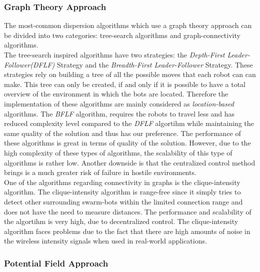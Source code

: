 \subsubsection{Graph Theory Approach}
The most-common dispersion algorithms which use a graph theory approach can be divided into two categories: tree-search algorithms and graph-connectivity algorithms.\\
The tree-search inspired algorithms have two strategies: the \emph{Depth-First Leader-Follower(DFLF)} Strategy and the \emph{Breadth-First Leader-Follower} Strategy.\cite{hsiang2004algorithms} These strategies rely on building a tree of all the possible moves that each robot can can make. 
This tree can only be created, if and only if it is possible to have a total overview of the environment in which the bots are located. Therefore the implementation of these algorithms are mainly considered as \emph{location-based} algorithms.
The \emph{BFLF} algorithm, requires the robots to travel less and has reduced complexity level compared to the \emph{DFLF} algortihm while maintaining the same quality of the solution and thus has our preference.
The performance of these algorithms is great in terms of quality of the solution.
However, due to the high complexity of these types of algorithms, the scalability of this type of algorithms is rather low.
Another downside is that the centralized control method brings is a much greater risk of failure in hostile environments.\\
One of the algorithms regarding connectivity in graphs is the clique-intensity algorithm.\cite{ugur2007dispersion}
The clique-intensity algorithm is range-free since it simply tries to detect other surrounding swarm-bots within the limited connection range and does not have the need to measure distances. The performance and scalability of the algortihm is very high, due to decentralized control.
The clique-intensity algorithm faces problems due to the fact that there are high amounts of noise in the wireless intensity signals when used in real-world applications. 

\subsubsection{Potential Field Approach}

